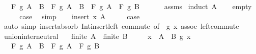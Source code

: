 \begin{isabellebody}
\ \ \ {\isachardoublequoteopen}F\ g\ {\isacharparenleft}{\kern0pt}A\ {\isasymunion}\ B{\isacharparenright}{\kern0pt}\ \isactrlbold {\isacharasterisk}{\kern0pt}\ F\ g\ {\isacharparenleft}{\kern0pt}A\ {\isasyminter}\ B{\isacharparenright}{\kern0pt}\ {\isacharequal}{\kern0pt}\ F\ g\ A\ \isactrlbold {\isacharasterisk}{\kern0pt}\ F\ g\ B{\isachardoublequoteclose}\isanewline
\ \ %
\isanewline
%
\isadelimproof
\ \ %
\endisadelimproof
%
\isatagproof
{}\isamarkupfalse%
\ assms\isanewline
{}\isamarkupfalse%
\ {\isacharparenleft}{\kern0pt}induct\ A{\isacharparenright}{\kern0pt}\isanewline
\ \ \isamarkupfalse%
\ empty\isanewline
\ \ \isamarkupfalse%
\ \isamarkupfalse%
\ {\isacharquery}{\kern0pt}case\ \isamarkupfalse%
\ simp\isanewline
{}\isamarkupfalse%
\isanewline
\ \ \isamarkupfalse%
\ {\isacharparenleft}{\kern0pt}insert\ x\ A{\isacharparenright}{\kern0pt}\isanewline
\ \ \isamarkupfalse%
\ \isamarkupfalse%
\ {\isacharquery}{\kern0pt}case\isanewline
\ \ \ \ \isamarkupfalse%
\ {\isacharparenleft}{\kern0pt}auto\ simp{\isacharcolon}{\kern0pt}\ insert{\isacharunderscore}{\kern0pt}absorb\ Int{\isacharunderscore}{\kern0pt}insert{\isacharunderscore}{\kern0pt}left\ commute\ {\isacharbrackleft}{\kern0pt}of\ {\isacharunderscore}{\kern0pt}\ {\isachardoublequoteopen}g\ x{\isachardoublequoteclose}{\isacharbrackright}{\kern0pt}\ assoc\ left{\isacharunderscore}{\kern0pt}commute{\isacharparenright}{\kern0pt}\isanewline
{}\isamarkupfalse%
%
\endisatagproof
{\isafoldproof}%
%
\isadelimproof
\isanewline
%
\endisadelimproof
\isanewline
{}\isamarkupfalse%
\ union{\isacharunderscore}{\kern0pt}inter{\isacharunderscore}{\kern0pt}neutral{\isacharcolon}{\kern0pt}\isanewline
\ \ \ {\isachardoublequoteopen}finite\ A{\isachardoublequoteclose}\ \ {\isachardoublequoteopen}finite\ B{\isachardoublequoteclose}\isanewline
\ \ \ \ \ {\isachardoublequoteopen}{\isasymforall}x\ {\isasymin}\ A\ {\isasyminter}\ B{\isachardot}{\kern0pt}\ g\ x\ {\isacharequal}{\kern0pt}\ \isanewline
\ \ \ {\isachardoublequoteopen}F\ g\ {\isacharparenleft}{\kern0pt}A\ {\isasymunion}\ B{\isacharparenright}{\kern0pt}\ {\isacharequal}{\kern0pt}\ F\ g\ A\ \isactrlbold {\isacharasterisk}{\kern0pt}\ F\ g\ B{\isachardoublequoteclose}\isanewline

\end{isabellebody}
